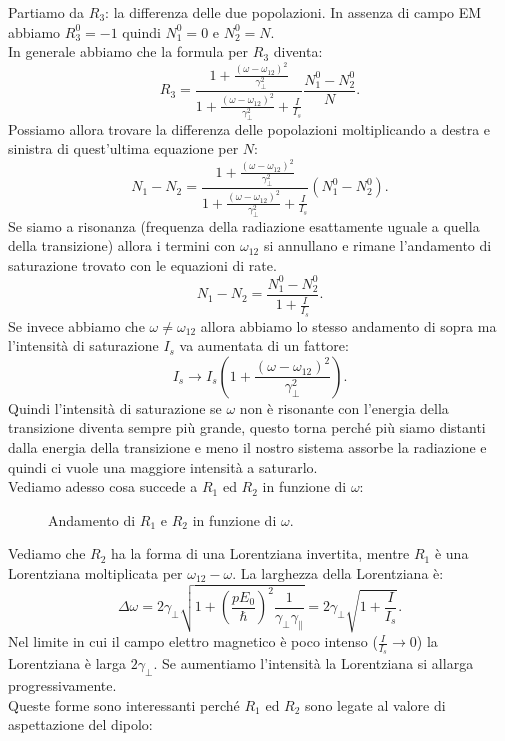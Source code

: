 Partiamo da $R_3$: la differenza delle due popolazioni. In assenza di campo EM abbiamo $R_3^0 = -1$ quindi $N_1^0 =0$ e $N_2^0 = N$.\\
In generale abbiamo che la formula per $R_3$ diventa:
\[
    R_3= 
    \frac{
    1+\frac{\left(\omega-\omega_{12}\right)^2}{\gamma_\perp^2}}
    {1+ \frac{\left(\omega-\omega_{12}\right)^2}{\gamma_\perp^2}
    + \frac{I}{I_s}}
    \frac{N_1^0-N_2^0}{N}
.\]
Possiamo allora trovare la differenza delle popolazioni moltiplicando a destra e sinistra di quest'ultima equazione per $N$:
\[
N_1-N_2 = 
    \frac{
    1+\frac{\left(\omega-\omega_{12}\right)^2}{\gamma_\perp^2}}
    {1+ \frac{\left(\omega-\omega_{12}\right)^2}{\gamma_\perp^2}
    + \frac{I}{I_s}}
    \left(N_1^0-N_2^0\right)
.\] 
Se siamo a risonanza (frequenza della radiazione esattamente uguale a quella della transizione) allora i termini con $\omega_{12}$  si annullano e rimane l'andamento di saturazione trovato con le equazioni di rate.
\[
N_1-N_2= \frac{N_1^0 -N_2^0}{1+\frac{I}{I_s}}
.\] 
Se invece abbiamo che $\omega\neq \omega_{12}$ allora abbiamo lo stesso andamento di sopra ma l'intensità di saturazione $I_s$ va aumentata di un fattore:
\[
    I_s \to
    I_s \left(1+ \frac{\left(\omega-\omega_{12}\right)^2}{\gamma_\perp^2}\right)
.\] 
Quindi l'intensità di saturazione se $\omega$ non è risonante con l'energia della transizione diventa sempre più grande, questo torna perché più siamo distanti dalla energia della transizione e meno il nostro sistema assorbe la radiazione e quindi ci vuole una maggiore intensità a saturarlo.\\
Vediamo adesso cosa succede a $R_1$ ed $R_2$ in funzione di $\omega$:
\begin{figure}[ht]
    \centering
    \caption{Andamento di $R_1$  e $R_2$  in funzione di $\omega$.}
    \label{fig:andamento-di-r1-e-r2-in-funzione-di-w}
\end{figure}
Vediamo che $R_2$ ha la forma di una Lorentziana invertita, mentre $R_1$ è una Lorentziana moltiplicata per $\omega_{12}-\omega$. La larghezza della Lorentziana è:
\[
    \Delta\omega =2\gamma_\perp\sqrt{1+\left(\frac{pE_0}{\hbar }\right)^2 
    \frac{1}{\gamma_\perp\gamma_\parallel}} =
    2\gamma_\perp  \sqrt{1+ \frac{I}{I_s}} 
.\] 
Nel limite in cui il campo elettro magnetico è poco intenso ($\frac{I}{I_s}\to 0$) la Lorentziana è larga $2\gamma_\perp$. Se aumentiamo l'intensità la Lorentziana si allarga progressivamente. \\
Queste forme sono interessanti perché $R_1$ ed $R_2$ sono legate al valore di aspettazione del dipolo:
